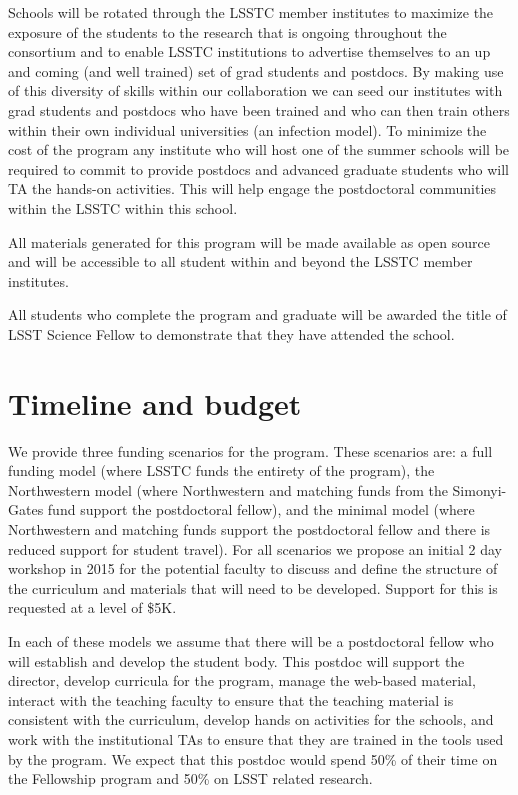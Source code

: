 \documentclass[nofootbib,floatfix,11pt]{article}
\begin{document}
Schools will be rotated through the LSSTC member institutes to maximize the exposure of the students to the research that is ongoing throughout the consortium and to enable LSSTC institutions to advertise themselves to an up and coming (and well trained) set of grad students and postdocs. By making use of this diversity of skills within our collaboration we can seed our institutes with grad students and postdocs who have been trained and who can then train others within their own individual universities (an infection model). To minimize the cost of the program any institute who will host one of the summer schools will be required to commit to provide postdocs and advanced graduate students who will TA the hands-on activities. This will help engage the postdoctoral communities within the LSSTC within this school. 

All materials generated for this program will be made available as open source and will be accessible to all student within and beyond the LSSTC member institutes.

All students who complete the program and graduate will be awarded the title of LSST Science Fellow to demonstrate that they have attended the school.


\section{Timeline and budget}

We provide three funding scenarios for the program. These scenarios are: a full funding model (where LSSTC funds the entirety of the  program), the Northwestern model (where Northwestern and matching funds from the Simonyi-Gates fund support the postdoctoral fellow), and the minimal model (where Northwestern and matching funds support the postdoctoral fellow and there is reduced support for student travel). For all scenarios we propose an initial 2 day workshop in 2015 for the potential faculty to discuss and define the structure of the curriculum and materials that will need to be developed. Support for this is requested at a level of \$5K.

In each of these models we assume that there will be a postdoctoral fellow who will establish and develop the student body. This postdoc will support the director, develop curricula for the program, manage the web-based material, interact with the teaching faculty to ensure that the teaching material is consistent with the curriculum, develop hands on activities for the schools, and work with the institutional TAs to ensure that they are trained in the tools used by the program. We expect that this postdoc would spend 50\% of their time on the Fellowship program and 50\% on LSST related research. 
\end{document}
